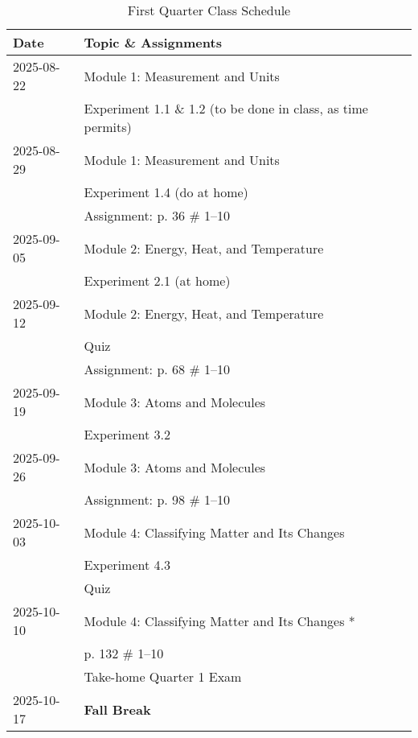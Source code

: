 \documentclass[11pt, oneside]{article}   	%
\begin{document}
\begin{table}[h]
\centering
\begin{tabular}{ l | l }
Date & Topic \& Assignments \\
\hline
2025-08-22 & Module 1:  Measurement and Units \\
                   & Experiment 1.1 \& 1.2 (to be done in class, as time permits) \\
\hline

2025-08-29 & Module 1:  Measurement and Units \\
                   & Experiment 1.4 (do at home) \\
                   & Assignment: p. 36 \# 1--10 \\
\hline

2025-09-05 & Module 2: Energy, Heat, and Temperature \\
                   & Experiment 2.1 (at home) \\
\hline

2025-09-12 & Module 2: Energy, Heat, and Temperature \\
	           & Quiz \\
	           & Assignment: p. 68 \# 1--10 \\ 
\hline

2025-09-19 & Module 3: Atoms and Molecules \\
                   & Experiment 3.2 \\
\hline

2025-09-26 & Module 3: Atoms and Molecules \\
                   & Assignment: p. 98 \# 1--10 \\ 
\hline

2025-10-03 & Module 4: Classifying Matter and Its Changes \\
                    & Experiment 4.3 \\
                    & Quiz \\
\hline

2025-10-10 & Module 4: Classifying Matter and Its Changes * \\
                   & p. 132 \# 1--10 \\
                   & Take-home Quarter 1 Exam \\
\hline

2025-10-17 & \textbf{Fall Break} \\

\end{tabular}
\caption{First Quarter Class Schedule}\label{table:class-schedule-q1}
\end{table}
\end{document}
